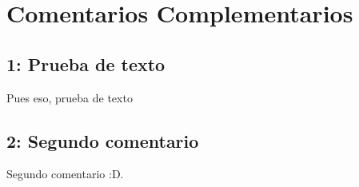 \chapter[Ordenados por referencias, no por aparición]{Comentarios Complementarios}

\section {1: Prueba de texto}

Pues eso, prueba de texto

\newpage

\section {2: Segundo comentario}

Segundo comentario :D.

\newpage
